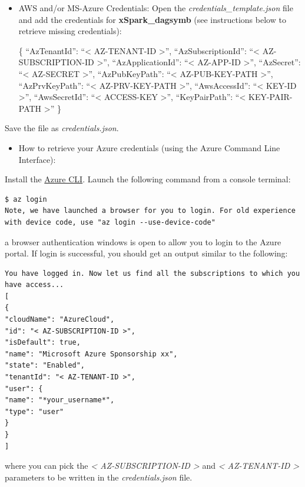 \begin{itemize}
\item
AWS and/or MS-Azure Credentials: Open the
\emph{credentials\_template.json} file and add the credentials for
\textbf{xSpark\_dagsymb} (see instructions below to retrieve missing
credentials):

\{ ``AzTenantId'': ``\textless{} AZ-TENANT-ID \textgreater{}'',
``AzSubscriptionId'': ``\textless{} AZ-SUBSCRIPTION-ID
\textgreater{}'', ``AzApplicationId'': ``\textless{} AZ-APP-ID
\textgreater{}'', ``AzSecret'': ``\textless{} AZ-SECRET
\textgreater{}'', ``AzPubKeyPath'': ``\textless{} AZ-PUB-KEY-PATH
\textgreater{}'', ``AzPrvKeyPath'': ``\textless{} AZ-PRV-KEY-PATH
\textgreater{}'', ``AwsAccessId'': ``\textless{} KEY-ID
\textgreater{}'', ``AwsSecretId'': ``\textless{} ACCESS-KEY
\textgreater{}'', ``KeyPairPath'': ``\textless{} KEY-PAIR-PATH
\textgreater{}'' \}
\end{itemize}

Save the file as \emph{credentials.json}.

\begin{itemize}
\item
How to retrieve your Azure credentials (using the Azure Command Line
Interface):
\end{itemize}

Install the
\href{https://docs.microsoft.com/it-it/cli/azure/install-azure-cli?view=azure-cli-latest}{Azure
CLI}. Launch the following command from a console terminal:

\begin{verbatim}
$ az login
Note, we have launched a browser for you to login. For old experience with device code, use "az login --use-device-code"
\end{verbatim}

a browser authentication windows is open to allow you to login to the
Azure portal. If login is successful, you should get an output similar
to the following:

\begin{verbatim}
You have logged in. Now let us find all the subscriptions to which you have access...
[
{
"cloudName": "AzureCloud",
"id": "< AZ-SUBSCRIPTION-ID >",
"isDefault": true,
"name": "Microsoft Azure Sponsorship xx",
"state": "Enabled",
"tenantId": "< AZ-TENANT-ID >",
"user": {
"name": "*your_username*",
"type": "user"
}
}
]
\end{verbatim}

where you can pick the \emph{\textless{} AZ-SUBSCRIPTION-ID
\textgreater{}} and \emph{\textless{} AZ-TENANT-ID \textgreater{}}
parameters to be written in the \emph{credentials.json} file.

